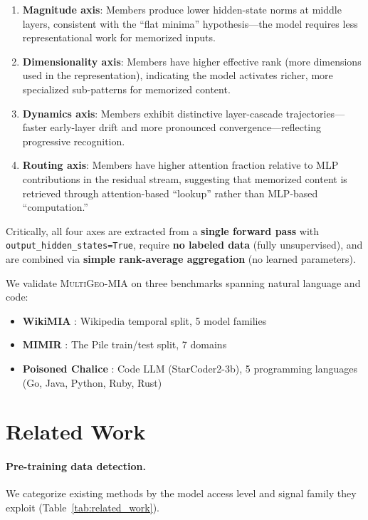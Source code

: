 \documentclass[11pt]{article}
\newcommand{\ours}{\textsc{MultiGeo-MIA}}
\begin{document}
\begin{enumerate}
    \item \textbf{Magnitude axis}: Members produce lower hidden-state norms at middle layers, consistent with the ``flat minima'' hypothesis---the model requires less representational work for memorized inputs.
    \item \textbf{Dimensionality axis}: Members have higher effective rank (more dimensions used in the representation), indicating the model activates richer, more specialized sub-patterns for memorized content.
    \item \textbf{Dynamics axis}: Members exhibit distinctive layer-cascade trajectories---faster early-layer drift and more pronounced convergence---reflecting progressive recognition.
    \item \textbf{Routing axis}: Members have higher attention fraction relative to MLP contributions in the residual stream, suggesting that memorized content is retrieved through attention-based ``lookup'' rather than MLP-based ``computation.''
\end{enumerate}

Critically, all four axes are extracted from a \textbf{single forward pass} with \texttt{output\_hidden\_states=True}, require \textbf{no labeled data} (fully unsupervised), and are combined via \textbf{simple rank-average aggregation} (no learned parameters).

We validate \ours{} on three benchmarks spanning natural language and code:
\begin{itemize}
    \item \textbf{WikiMIA} \citep{shi2024detecting}: Wikipedia temporal split, 5 model families
    \item \textbf{MIMIR} \citep{duan2024membership}: The Pile train/test split, 7 domains
    \item \textbf{Poisoned Chalice} \citep{poisonedchalice2026}: Code LLM (StarCoder2-3b), 5 programming languages (Go, Java, Python, Ruby, Rust)
\end{itemize}

\section{Related Work}
\label{sec:related}

\paragraph{Pre-training data detection.}
We categorize existing methods by the model access level and signal family they exploit (Table~\ref{tab:related_work}).
\end{document}
